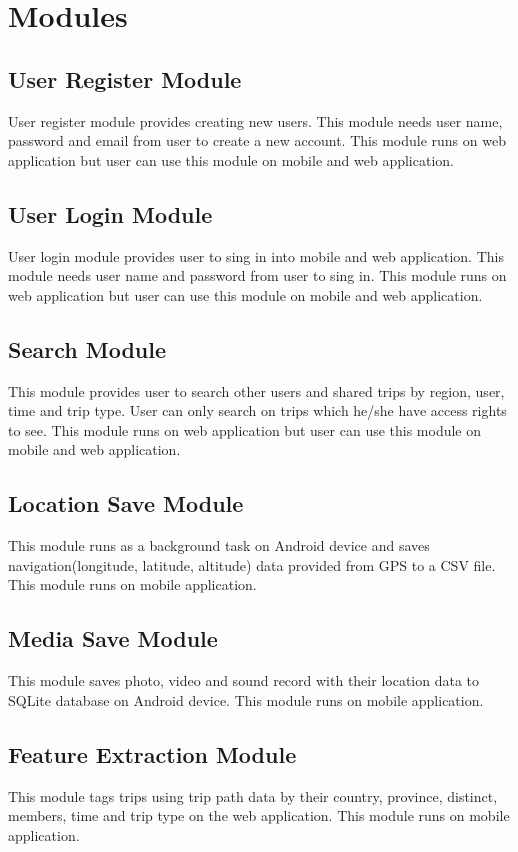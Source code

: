 \section{Modules}

\subsection{User Register Module}
User register module provides creating new users. This module needs user name, password and email from user to create a new account. This module runs on web application but user can use this module on mobile and web application.
\subsection{User Login Module}
User login module provides user to sing in into mobile and web application. This module needs user name and password from user to sing in. This module runs on web application but user can use this module on mobile and web application.
\subsection{Search Module}
This module provides user to search other users and shared trips by region, user, time and trip type. User can only search on trips which he/she have access rights to see. This module runs on web application but user can use this module on mobile and web application. 
\subsection{Location Save Module}
This module runs as a background task on Android device and saves navigation(longitude, latitude, altitude) data provided from GPS to a CSV file. This module runs on mobile application.
\subsection{Media Save Module}
This module saves photo, video and sound record with their location data to SQLite database on Android device. This module runs on mobile application.
\subsection{Feature Extraction Module}
This module tags trips using trip path data by their country, province, distinct, members, time and trip type on the web application. This module runs on mobile application.

